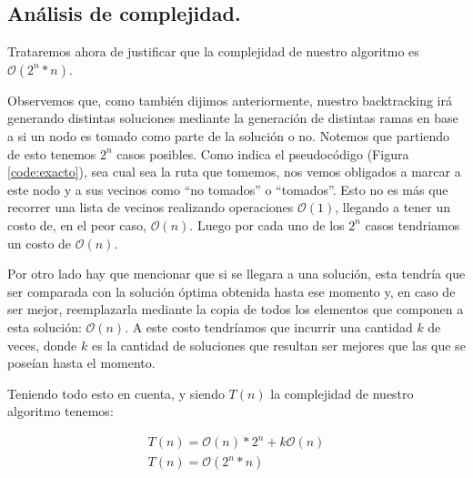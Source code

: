 \vspace*{0.6cm}


\subsection{Análisis de complejidad.}

\vspace*{0.3cm}

Trataremos ahora de justificar que la complejidad de nuestro algoritmo es $\mathcal{O}(2^n * n)$.

Observemos que, como también dijimos anteriormente, nuestro backtracking irá generando distintas soluciones mediante la generación de distintas ramas en base a si un nodo es tomado como parte de la solución o no. Notemos que partiendo de esto tenemos $2^n$ casos posibles. Como indica el pseudocódigo (Figura \ref{code:exacto}), sea cual sea la ruta que tomemos, nos vemos obligados a marcar a este nodo y a sus vecinos como ``no tomados'' o ``tomados''. Esto no es más que recorrer una lista de vecinos realizando operaciones $\mathcal{O}(1)$, llegando a tener un costo de, en el peor caso, $\mathcal{O}(n)$. Luego por cada uno de los $2^n$ casos tendriamos un costo de $\mathcal{O}(n)$.

Por otro lado hay que mencionar que si se llegara a una solución, esta tendría que ser comparada con la solución óptima obtenida hasta ese momento y, en caso de ser mejor, reemplazarla mediante la copia de todos los elementos que componen a esta solución: $\mathcal{O}(n)$. A este costo tendríamos que incurrir una cantidad $k$ de veces, donde $k$ es la cantidad de soluciones que resultan ser mejores que las que se poseían hasta el momento.

Teniendo todo esto en cuenta, y siendo $T(n)$ la complejidad de nuestro algoritmo tenemos:

\begin{equation*}
\begin{array}{l}
T(n) = \mathcal{O}(n)*2^n + k\mathcal{O}(n)\\
T(n) = \mathcal{O}(2^n *n)
\end{array}
\end{equation*}





